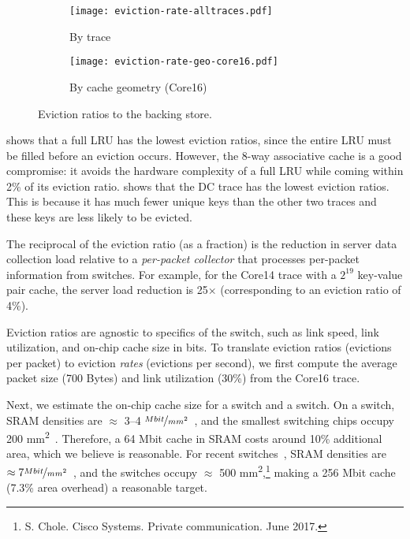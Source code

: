 \begin{figure}[!t]
\centering
\begin{subfigure}[t]{0.48\columnwidth}
\raggedright
\texttt{[image: eviction-rate-alltraces.pdf]}
\vspace{-0.2in}
\caption{By trace}
\label{fig:eviction-traces}
\end{subfigure}
\begin{subfigure}[t]{0.48\columnwidth}
\raggedleft
\texttt{[image: eviction-rate-geo-core16.pdf]}
\vspace{-0.2in}
\caption{By cache geometry (Core16)}
\label{fig:eviction-geo}
\end{subfigure}
\vspace{-0.1in}
\caption{Eviction ratios to the backing store.}
\vspace{-0.25in}
\label{fig:eviction-ratios}
\end{figure}

 shows that a full LRU has the lowest eviction ratios, since
the entire LRU must be filled before an eviction occurs. However, the 8-way
associative cache is a good compromise: it avoids the hardware complexity of a
full LRU while coming within 2\% of its eviction ratio.  
shows that the DC trace has the lowest eviction ratios.  This is because it has
much fewer unique keys than the other two traces and these keys are less likely
to be evicted.

The reciprocal of the eviction ratio (as a fraction) is the reduction in server
data collection load relative to a {\em per-packet collector} that processes
per-packet information from switches. For example, for the Core14 trace with a
$2^{19}$ key-value pair cache, the server load reduction is 25$\times$
(corresponding to an eviction ratio of 4\%).

Eviction ratios are agnostic to specifics of the switch, such as link speed,
link utilization, and on-chip cache size in bits. To translate
eviction ratios (evictions per packet) to eviction \emph{rates} (evictions per
second), we first compute the average packet size (700 Bytes) and link utilization
(30\%) from the Core16 trace.

Next, we estimate the on-chip cache size for a \tengswitch switch and a
\hundredgswitch switch.
On a \tengswitch switch, SRAM
densities are $\approx$ 3--4 $\nicefrac{Mbit}{mm^2}$~\cite{sram_45nm_wiki}, and
the smallest switching chips occupy 200
\si{\milli\metre\squared}~\cite{gibb_parsing}.  Therefore, a 64 Mbit cache in
SRAM costs around 10\% additional area, which we believe is reasonable.
For recent \hundredgswitch switches~\cite{tomahawk2},
 SRAM densities are $\approx7
\nicefrac{Mbit}{mm^2}$~\cite{sram_estimate}, and the switches occupy
$\approx$ 500 \si{\milli\metre\squared},\footnote{S. Chole. Cisco Systems. Private
communication.  June 2017.} making a 256 Mbit cache (7.3\% area
overhead) a reasonable target.

